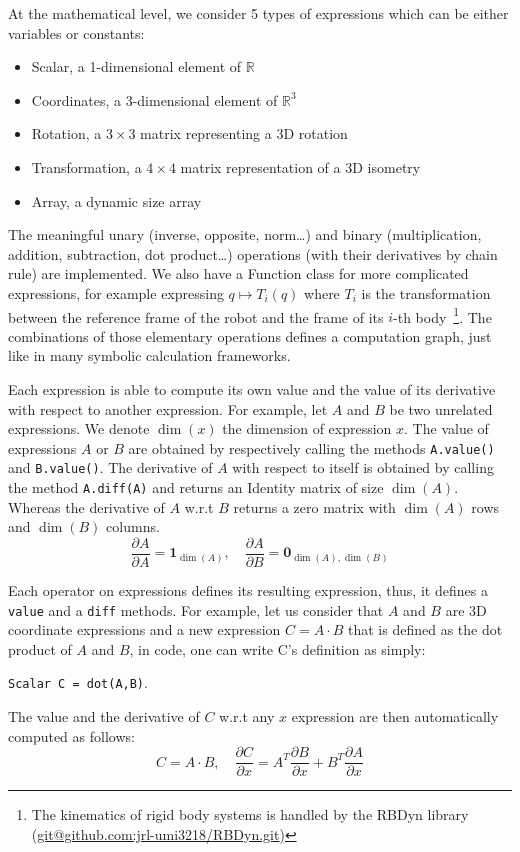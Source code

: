 At the mathematical level, we consider 5 types of expressions which can be either variables or constants:
\begin{itemize}
  \item Scalar, a 1-dimensional element of $\mathbb{R}$
  \item Coordinates, a 3-dimensional element of $\mathbb{R}^3$
  \item Rotation, a $3\times3$ matrix representing a 3D rotation
  \item Transformation, a $4\times4$ matrix representation of a 3D isometry
  \item Array, a dynamic size array
\end{itemize}
The meaningful unary (inverse, opposite, norm\ldots) and binary (multiplication, addition, subtraction, dot product\ldots) operations (with their derivatives by chain rule) are implemented.
We also have a Function class for more complicated expressions, for example expressing $q \mapsto T_i(q)$ where $T_i$ is the transformation between the reference frame of the robot and the frame of its $i$-th body~\footnote{The kinematics of rigid body systems is handled by the RBDyn library (\url{git@github.com:jrl-umi3218/RBDyn.git})}.
The combinations of those elementary operations defines a computation graph, just like in many symbolic calculation frameworks.

Each expression is able to compute its own value and the value of its derivative with respect to another expression.
For example, let $A$ and $B$ be two unrelated expressions.
We denote $\dim(x)$ the dimension of expression $x$.
The value of expressions $A$ or $B$ are obtained by respectively calling the methods {\tt A.value()} and {\tt B.value()}.
The derivative of $A$ with respect to itself is obtained by calling the method {\tt A.diff(A)} and returns an Identity matrix of size $\dim(A)$.
Whereas the derivative of $A$ w.r.t $B$ returns a zero matrix with $\dim(A)$ rows and $\dim(B)$ columns.
\begin{equation}\nonumber
  \frac{\partial A}{\partial A} = \mathbf{1}_{\dim(A)}, \quad \frac{\partial A}{\partial B} = \mathbf{0}_{\dim(A),\dim(B)}
\end{equation}

Each operator on expressions defines its resulting expression, thus, it defines a {\tt value} and a {\tt diff} methods.
For example, let us consider that $A$ and $B$ are 3D coordinate expressions and a new expression $C = A\cdot B$ that is defined as the dot product of $A$ and $B$, in code, one can write C's definition as simply:
\begin{center}
{\tt Scalar C = dot(A,B)}.
\end{center}
The value and the derivative of $C$ w.r.t any $x$ expression are then automatically computed as follows:
\begin{equation}
\label{eq:dot}
  C = A\cdot B,\quad \frac{\partial C}{\partial x} = A^T\frac{\partial B}{\partial x} + B^T\frac{\partial A}{\partial x}
\end{equation}

